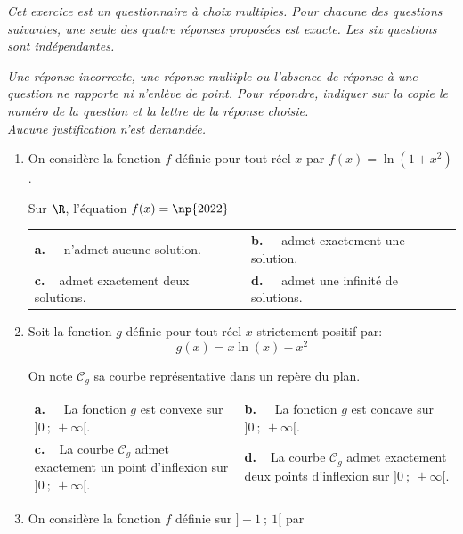 \medskip

\emph{Cet exercice est un questionnaire à choix multiples. Pour chacune des questions suivantes, une seule des quatre réponses proposées est exacte. Les six questions sont indépendantes.}

\smallskip

\emph{Une réponse incorrecte, une réponse multiple ou l'absence de réponse à une question ne rapporte ni n'enlève de point. Pour répondre, indiquer sur la copie le numéro de la question et la lettre de la réponse choisie. \\
Aucune justification n'est demandée.}

\medskip

\begin{enumerate}
\item On considère la fonction $f$ définie pour tout réel $x$ par $f(x) = \ln \left(1  + x^2\right)$. 

Sur $\R$, l'équation $f(x) = \np{2022}$

\begin{center}
\begin{tabularx}{\linewidth}{*{2}{X}}
\textbf{a.~~} n'admet aucune solution. &\textbf{b.~~} admet exactement une solution.\\
\textbf{c.~~}admet exactement deux solutions.&\textbf{d.~~} admet une infinité de solutions.
\end{tabularx}
\end{center}

\item Soit la fonction $g$ définie pour tout réel $x$ strictement positif par: 
\[g(x) = x \ln (x) - x^2\]

On note $\mathcal{C}_g$ sa courbe représentative dans un repère du plan.

\begin{center}
\begin{tabularx}{\linewidth}{*{2}{X}}
\textbf{a.~~} La fonction $g$ est convexe sur $]0~;~+\infty[$.&\textbf{b.~~} La fonction $g$ est concave sur $]0~;~+\infty[$.\\
\textbf{c.~~}La courbe $\mathcal{C}_g$ admet exactement un point d'inflexion sur $]0~;~+\infty[$.&\textbf{d.~~}La courbe $\mathcal{C}_g$ admet exactement
deux points d'inflexion sur $]0~;~+\infty[$.
\end{tabularx}
\end{center}

\item On considère la fonction $f$ définie sur $]- 1~;~1[$ par


\end{enumerate}
